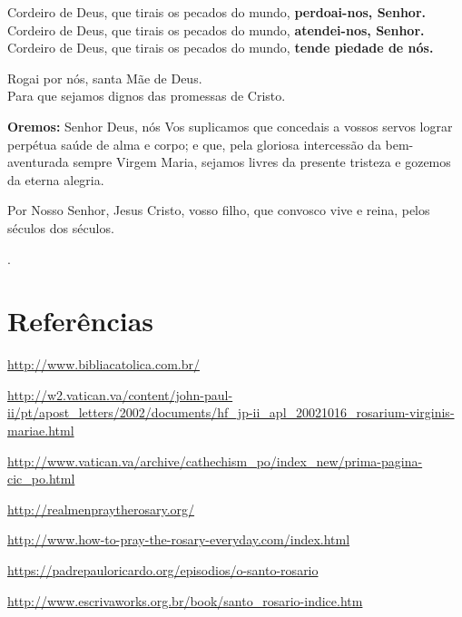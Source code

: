 \documentclass{rosario}
\begin{document}
Cordeiro de Deus, que tirais os pecados do mundo, \textbf{perdoai-nos, Senhor.} \\
Cordeiro de Deus, que tirais os pecados do mundo, \textbf{atendei-nos, Senhor.} \\
Cordeiro de Deus, que tirais os pecados do mundo, \textbf{tende piedade de nós.}

Rogai por nós, santa Mãe de Deus. \\
Para que sejamos dignos das promessas de Cristo.

\textbf{Oremos:}
Senhor Deus, nós Vos suplicamos que concedais a vossos servos lograr perpétua saúde de alma e corpo;
e que, pela gloriosa intercessão da bem-aventurada sempre Virgem Maria, sejamos livres da presente tristeza e gozemos da eterna alegria.

Por Nosso Senhor, Jesus Cristo, vosso filho, que convosco vive e reina, pelos séculos dos séculos.

\amen.


\chapter{Referências}


\url{http://www.bibliacatolica.com.br/}


\url{http://w2.vatican.va/content/john-paul-ii/pt/apost_letters/2002/documents/hf_jp-ii_apl_20021016_rosarium-virginis-mariae.html}


\url{http://www.vatican.va/archive/cathechism_po/index_new/prima-pagina-cic_po.html}


\url{http://realmenpraytherosary.org/}

\url{http://www.how-to-pray-the-rosary-everyday.com/index.html}


\url{https://padrepauloricardo.org/episodios/o-santo-rosario}


\url{http://www.escrivaworks.org.br/book/santo_rosario-indice.htm}

\end{document}
